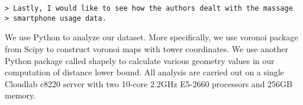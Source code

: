 
\begin{verbatim}
> Lastly, I would like to see how the authors dealt with the massage
> smartphone usage data.
\end{verbatim}

We use Python to analyze our dataset. More specifically, we use voronoi package from Scipy to construct voronoi maps with tower coordinates. We use another Python package called shapely to calculate various geometry values in our computation of distance lower bound. All analysis are carried out on a single Cloudlab c8220 server with two 10-core 2.2GHz E5-2660 processors and 256GB memory.

